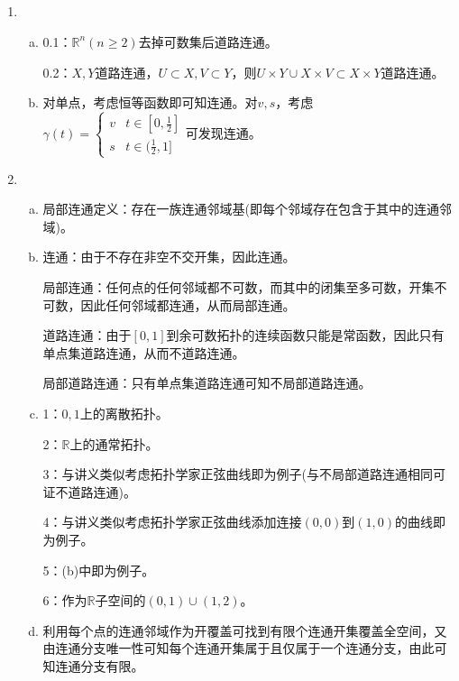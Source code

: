 \documentclass[a4paper,UTF8,fontset=windows]{ctexart}
\begin{document}
\subsection{}
\begin{enumerate}[(1)]
    \item
    \begin{enumerate}[(a)]
    \item
    0.1：$\mathbb{R}^n(n\ge2)$去掉可数集后道路连通。
    
    0.2：$X,Y$道路连通，$U\subset X,V\subset Y$，则$U\times Y\cup X\times V\subset X\times Y$道路连通。
    
    \item
    对单点，考虑恒等函数即可知连通。对$v,s$，考虑$\gamma(t)=\begin{cases}v&t\in[0,\frac{1}{2}]\\s&t\in(\frac{1}{2},1]\end{cases}$可发现连通。
    \end{enumerate}
    
    \item
    \begin{enumerate}[(a)]
    \item
    局部连通定义：存在一族连通邻域基(即每个邻域存在包含于其中的连通邻域)。
    
    \item
    连通：由于不存在非空不交开集，因此连通。
    
    局部连通：任何点的任何邻域都不可数，而其中的闭集至多可数，开集不可数，因此任何邻域都连通，从而局部连通。
    
    道路连通：由于$[0,1]$到余可数拓扑的连续函数只能是常函数，因此只有单点集道路连通，从而不道路连通。
    
    局部道路连通：只有单点集道路连通可知不局部道路连通。
    
    \item
    1：${0,1}$上的离散拓扑。
    
    2：$\mathbb{R}$上的通常拓扑。
    
    3：与讲义类似考虑拓扑学家正弦曲线即为例子(与不局部道路连通相同可证不道路连通)。
    
    4：与讲义类似考虑拓扑学家正弦曲线添加连接$(0,0)$到$(1,0)$的曲线即为例子。
    
    5：(b)中即为例子。
    
    6：作为$\mathbb{R}$子空间的$(0,1)\cup(1,2)$。
    
    \item
    利用每个点的连通邻域作为开覆盖可找到有限个连通开集覆盖全空间，又由连通分支唯一性可知每个连通开集属于且仅属于一个连通分支，由此可知连通分支有限。
    

\end{enumerate}
\end{enumerate}
\end{document}
